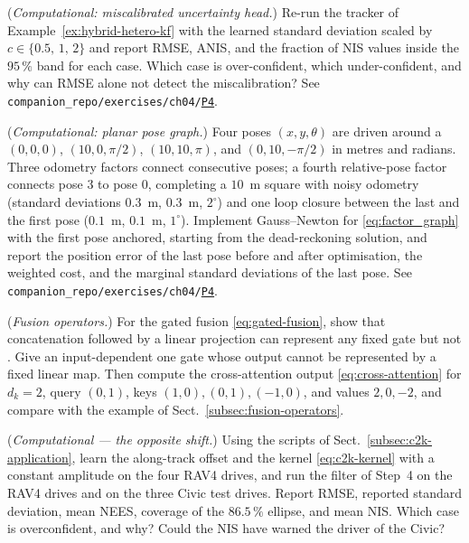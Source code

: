 \documentclass[graybox,envcountchap]{style/SNmono}
\newcommand{\repopath}[1]{\texttt{#1}}
\providecommand{\DIFadd}[1]{{\protect\color{blue} #1}} %
\providecommand{\DIFdel}[1]{{\protect\color{red} #1}} %
\providecommand{\DIFaddbegin}{} %
\providecommand{\DIFaddend}{} %
\providecommand{\DIFdelbegin}{} %
\providecommand{\DIFdelend}{} %
\DeclareRobustCommand{\RtwoDel}[1]{{\color{red}%
  \renewcommand{\DIFadd}[1]{##1}\renewcommand{\DIFdel}[1]{##1}%
  #1}}
\DeclareRobustCommand{\RtwoAdd}[1]{{\color{blue}#1}}
\DeclareRobustCommand{\codeentry}[1]{\hyperref[code:#1]{\texttt{#1}}}
\begin{document}
\begin{prob}\label{prob:ch04:6}
(\emph{Computational: miscalibrated uncertainty head.}) Re-run the tracker of Example~\ref{ex:hybrid-hetero-kf} with the learned standard deviation scaled by $c\in\{0.5,\,1,\,2\}$ and report RMSE, ANIS, and the fraction of NIS values inside the $95\,\%$ band for each case. Which case is over-confident, which under-confident, and why can RMSE alone not detect the miscalibration? See \RtwoDel{\repopath{companion\_\allowbreak repo/\allowbreak exercises/\allowbreak ch04/\allowbreak }}\RtwoAdd{\codeentry{P4}}.
\end{prob}
\begin{prob}\label{prob:ch04:7}
(\emph{Computational: planar pose graph.}) Four poses $(x,y,\theta)$ are \DIFdelbegin \DIFdel{driven around a }\DIFdelend \DIFaddbegin \DIFadd{$(0,0,0)$, $(10,0,\pi/2)$, $(10,10,\pi)$, and $(0,10,-\pi/2)$ in metres and radians. Three odometry factors connect consecutive poses; a fourth relative-pose factor connects pose 3 to pose 0, completing a }\DIFaddend $10$~m square with noisy odometry (standard deviations $0.3$~m, $0.3$~m, $2^{\circ}$) and one loop closure between the last and the first pose ($0.1$~m, $0.1$~m, $1^{\circ}$). Implement Gauss--Newton for \eqref{eq:factor_graph} with the first pose anchored, starting from the dead-reckoning solution, and report the position error of the last pose before and after optimisation, the weighted cost, and the marginal standard deviations of the last pose. See \RtwoDel{\repopath{companion\_\allowbreak repo/\allowbreak exercises/\allowbreak ch04/\allowbreak }}\RtwoAdd{\codeentry{P4}}.
\end{prob}
\begin{prob}\label{prob:ch04:8}
(\emph{Fusion operators.}) For the gated fusion \eqref{eq:gated-fusion}, show that concatenation followed by a linear projection can represent any fixed gate\DIFdelbegin \DIFdel{but not }\DIFdelend \DIFaddbegin \DIFadd{. Give }\DIFaddend an input-dependent \DIFdelbegin \DIFdel{one}\DIFdelend \DIFaddbegin \DIFadd{gate whose output cannot be represented by a fixed linear map}\DIFaddend . Then compute the cross-attention output \eqref{eq:cross-attention} for $d_k=2$, query $(0,1)$, keys $(1,0),(0,1),(-1,0)$, and values $2,0,-2$, and compare with the example of Sect.~\ref{subsec:fusion-operators}.
\end{prob}

\begin{prob}\label{prob:ch04:9}
(\emph{Computational --- the opposite shift.}) Using the scripts of Sect.~\ref{subsec:c2k-application}, learn the along-track offset and the kernel \eqref{eq:c2k-kernel} with a constant amplitude on the four RAV4 drives, and run the filter of Step~4 on the RAV4 drives and on the three Civic test drives. Report RMSE, reported standard deviation, mean NEES, coverage of the $86.5\,\%$ ellipse, and mean NIS. Which case is overconfident, and why? Could the NIS have warned the driver of the Civic?
\end{prob}
\end{document}
